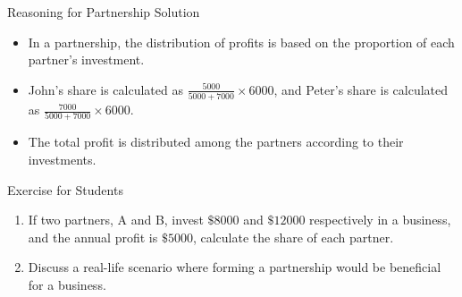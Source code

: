 \begin{frame}{Reasoning for Partnership Solution}
  \begin{itemize}
    \item In a partnership, the distribution of profits is based on the proportion of each partner's investment.
    \item John's share is calculated as $\frac{5000}{5000 + 7000} \times 6000$, and Peter's share is calculated as $\frac{7000}{5000 + 7000} \times 6000$.
    \item The total profit is distributed among the partners according to their investments.
  \end{itemize}
\end{frame}

\begin{frame}{Exercise for Students}
  \begin{enumerate}
    \item If two partners, A and B, invest $\$8000$ and $\$12000$ respectively in a business, and the annual profit is $\$5000$, calculate the share of each partner.
    \item Discuss a real-life scenario where forming a partnership would be beneficial for a business.
  \end{enumerate}
\end{frame}

